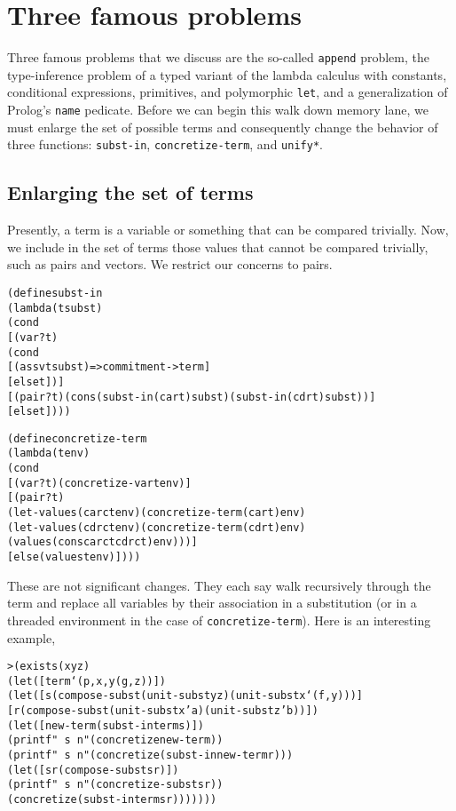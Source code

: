 \section{Three famous problems}

Three famous problems that we discuss are the so-called
\texttt{append} problem, the type-inference problem of a typed variant
of the lambda calculus with constants, conditional expressions,
primitives, and polymorphic \texttt{let}, and a generalization of
Prolog's \texttt{name} pedicate.  Before we can begin this walk down
memory lane, we must enlarge the set of possible terms and
consequently change the behavior of three functions:
\texttt{subst-in}, \texttt{concretize-term}, and \texttt{unify*}.

\subsection{Enlarging the set of terms}

Presently, a term is a variable or something that can be compared
trivially.  Now, we include in the set of terms those values that
cannot be compared trivially, such as pairs and vectors.  We restrict
our concerns to pairs.

\begin{alltt}
(define subst-in
  (lambda (t subst)
    (cond
      [(var? t)
       (cond
         [(assv t subst) => commitment->term]
         [else t])]
      [(pair? t) (cons (subst-in (car t) subst) (subst-in (cdr t) subst))]
      [else t])))

(define concretize-term
  (lambda (t env)
    (cond
      [(var? t) (concretize-var t env)]
      [(pair? t)
       (let-values (carct env) (concretize-term (car t) env)
         (let-values (cdrct env) (concretize-term (cdr t) env)
           (values (cons carct cdrct) env)))]
      [else (values t env)])))
\end{alltt}

These are not significant changes.  They each say walk recursively
through the term and replace all variables by their association in a
substitution (or in a threaded environment in the case of \texttt{concretize-term}).
\newpage
Here is an interesting example,

\begin{alltt} 
> (exists (x y z)
    (let ([term `(p ,x ,y (g ,z))])
      (let ([s (compose-subst (unit-subst y z) (unit-subst x `(f ,y)))]
            [r (compose-subst (unit-subst x 'a) (unit-subst z 'b))])
        (let ([new-term (subst-in term s)])
          (printf "~s~n" (concretize new-term))
          (printf "~s~n" (concretize (subst-in new-term r)))
          (let ([sr (compose-subst s r)])
            (printf "~s~n" (concretize-subst sr))
            (concretize (subst-in term sr)))))))
\end{alltt}


